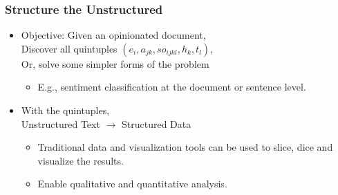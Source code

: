 \documentclass[t]{beamer}
\begin{document}
\begin{frame} \frametitle{Structure the Unstructured} %

\begin{itemize}

\item Objective: Given an opinionated document, \\
Discover all quintuples $(e_i, a_{jk}, so_{ijkl}, h_k, t_l)$, \\
Or, solve some simpler forms of the problem \\
\begin{itemize}
   \item E.g., sentiment classification at the document or sentence level.
\end{itemize}

\item With the quintuples, \\
Unstructured Text $\rightarrow$ Structured Data
\begin{itemize}
\item Traditional data and visualization tools can be used to slice,
  dice and visualize the results. 
\item Enable qualitative and quantitative analysis.
\end{itemize}


\end{itemize}

\end{frame} 


\end{document}
